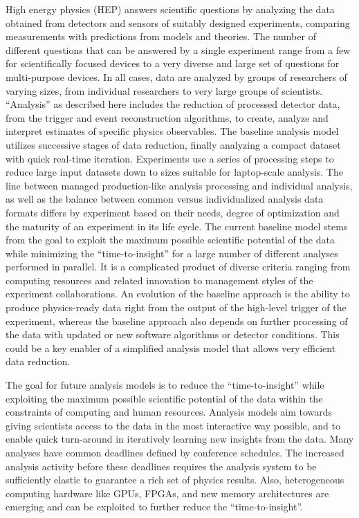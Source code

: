 \documentclass[12pt,a4paper]{article}
\begin{document}
High energy physics (HEP) answers scientific questions by analyzing the data obtained from detectors and sensors of suitably designed experiments, comparing measurements with predictions from models and theories. The number of different questions that can be answered by a single experiment range from a few for scientifically focused devices to a very diverse and large set of questions for multi-purpose devices. In all cases, data are analyzed by groups of researchers of varying sizes, from individual researchers to very large groups of scientists. ``Analysis'' as described here includes the reduction of processed detector data, from the trigger and event reconstruction algorithms, to create, analyze and interpret estimates of specific physics observables. The baseline analysis model utilizes successive stages of data reduction, finally analyzing a compact dataset with quick real-time iteration. Experiments use a series of processing steps to reduce large input datasets down to sizes suitable for laptop-scale analysis. The line between managed production-like analysis processing and individual analysis, as well as the balance between common versus individualized analysis data formats differs by experiment based on their needs, degree of optimization and the maturity of an experiment in its life cycle. The current baseline model stems from the goal to exploit the maximum possible scientific potential of the data while minimizing the ``time-to-insight'' for a large number of different analyses performed in parallel. It is a complicated product of diverse criteria ranging from computing resources and related innovation to management styles of the experiment collaborations. An evolution of the baseline approach is the ability to produce physics-ready data right from the output of the high-level trigger of the experiment, whereas the baseline approach also depends on further processing of the data with updated or new software algorithms or detector conditions. This could be a key enabler of a simplified analysis model that allows very efficient data reduction.

The goal for future analysis models is to reduce the ``time-to-insight'' while exploiting the maximum possible scientific potential of the data within the constraints of computing and human resources. Analysis models aim towards giving scientists access to the data in the most interactive way possible, and to enable quick turn-around in iteratively learning new insights from the data. Many analyses have common deadlines defined by conference schedules. The increased analysis activity before these deadlines requires the analysis system to be sufficiently elastic to guarantee a rich set of physics results. Also, heterogeneous computing hardware like GPUs, FPGAs, and new memory architectures are emerging and can be exploited to further reduce the ``time-to-insight''.
\end{document}
